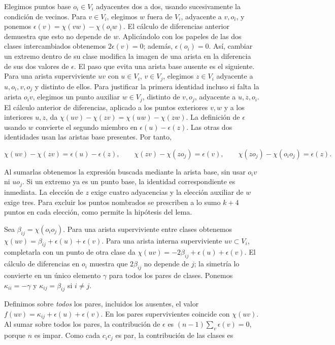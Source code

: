 \documentclass[spanish,11pt,a4paper]{article}
\begin{document}
Elegimos puntos base \(o_i\in V_i\) adyacentes dos a dos, usando sucesivamente la condición de vecinos. Para \(v\in V_i\), elegimos \(w\) fuera de \(V_i\), adyacente a \(v,o_i\), y ponemos \(\epsilon(v)=\chi(vw)-\chi(o_iw)\). El cálculo de diferencias anterior demuestra que esto no depende de \(w\). Aplicándolo con los papeles de las dos clases intercambiados obtenemos \(2\epsilon(v)=0\); además, \(\epsilon(o_i)=0\). Así, cambiar un extremo dentro de su clase modifica la imagen de una arista en la diferencia de sus dos valores de \(\epsilon\). El paso que evita una arista base ausente es el siguiente. Para una arista superviviente \(uv\) con \(u\in V_i\), \(v\in V_j\), elegimos \(z\in V_i\) adyacente a \(u,o_i,v,o_j\) y distinto de ellos. Para justificar la primera identidad incluso si falta la arista \(o_iv\), elegimos un punto auxiliar \(w\in V_j\), distinto de \(v,o_j\), adyacente a \(u,z,o_i\). El cálculo anterior de diferencias, aplicado a los puntos exteriores \(v,w\) y a los interiores \(u,z\), da \(\chi(uv)-\chi(zv)=\chi(uw)-\chi(zw)\). La definición de \(\epsilon\) usando \(w\) convierte el segundo miembro en \(\epsilon(u)-\epsilon(z)\). Las otras dos identidades usan las aristas base presentes. Por tanto,

\[\chi(uv)-\chi(zv)=\epsilon(u)-\epsilon(z),\qquad
\chi(zv)-\chi(zo_j)=\epsilon(v),\qquad
\chi(zo_j)-\chi(o_io_j)=\epsilon(z).\]

Al sumarlas obtenemos la expresión buscada mediante la arista base, sin usar \(o_iv\) ni \(uo_j\). Si un extremo ya es un punto base, la identidad correspondiente es inmediata. La elección de \(z\) exige cuatro adyacencias y la elección auxiliar de \(w\) exige tres. Para excluir los puntos nombrados se prescriben a lo sumo \(k+4\) puntos en cada elección, como permite la hipótesis del lema.

Sea \(\beta_{ij}=\chi(o_io_j)\). Para una arista superviviente entre clases obtenemos \(\chi(uv)=\beta_{ij}+\epsilon(u)+\epsilon(v)\). Para una arista interna superviviente \(uv\subset V_i\), completarla con un punto de otra clase da \(\chi(uv)=-2\beta_{ij}+\epsilon(u)+\epsilon(v)\). El cálculo de diferencias en \(o_i\) muestra que \(2\beta_{ij}\) no depende de \(j\); la simetría lo convierte en un único elemento \(\gamma\) para todos los pares de clases. Ponemos \(\kappa_{ii}=-\gamma\) y \(\kappa_{ij}=\beta_{ij}\) si \(i\ne j\).

Definimos sobre \emph{todos} los pares, incluidos los ausentes, el valor \(f(uv)=\kappa_{ij}+\epsilon(u)+\epsilon(v)\). En los pares supervivientes coincide con \(\chi(uv)\). Al sumar sobre todos los pares, la contribución de \(\epsilon\) es \((n-1)\sum_v\epsilon(v)=0\), porque \(n\) es impar. Como cada \(c_ic_j\) es par, la contribución de las clases es
\end{document}
